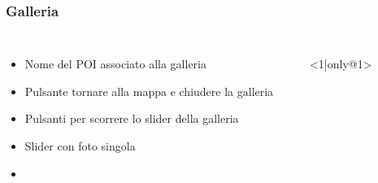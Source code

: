 \documentclass{beamer}
\begin{document}
\begin{frame}
\frametitle{Galleria}
\begin{columns}
\begin{itemize}
 	\item <2-> Nome del POI associato alla galleria
 	\item <3-> Pulsante tornare alla mappa e chiudere la galleria
 	\item <4-> Pulsanti per scorrere lo slider della galleria
 	\item <5-> Slider con foto singola 
 	\item <5->  
\end{itemize}

\begin{itemize}
	\item[] <1|only@1> 
		\begin{figure}[!h]
 			\centering

\end{figure}
\end{itemize}
\end{columns}
\end{frame}
\end{document}
